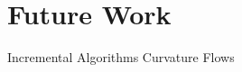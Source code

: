 \documentclass[a4paper,UKenglish]{lipics}
\begin{document}
\section{Future Work} %
\label{sec:future_work}

  Incremental Algorithms
  Curvature Flows






%
\end{document}

